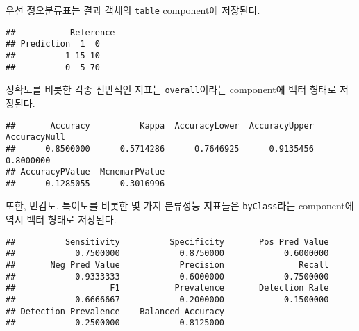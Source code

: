 \documentclass[
]{book}
\newenvironment{Shaded}{\begin{snugshade}}{\end{snugshade}}
\newcommand{\NormalTok}[1]{#1}
\newcommand{\SpecialCharTok}[1]{\textcolor[rgb]{0.00,0.00,0.00}{#1}}
\begin{document}
우선 정오분류표는 결과 객체의 \texttt{table} component에 저장된다.

\begin{Shaded}
\end{Shaded}

\begin{verbatim}
##           Reference
## Prediction  1  0
##          1 15 10
##          0  5 70
\end{verbatim}

정확도를 비롯한 각종 전반적인 지표는 \texttt{overall}이라는 component에 벡터 형태로 저장된다.

\begin{Shaded}
\end{Shaded}

\begin{verbatim}
##       Accuracy          Kappa  AccuracyLower  AccuracyUpper   AccuracyNull 
##      0.8500000      0.5714286      0.7646925      0.9135456      0.8000000 
## AccuracyPValue  McnemarPValue 
##      0.1285055      0.3016996
\end{verbatim}

또한, 민감도, 특이도를 비롯한 몇 가지 분류성능 지표들은 \texttt{byClass}라는 component에 역시 벡터 형태로 저장된다.

\begin{Shaded}
\end{Shaded}

\begin{verbatim}
##          Sensitivity          Specificity       Pos Pred Value 
##            0.7500000            0.8750000            0.6000000 
##       Neg Pred Value            Precision               Recall 
##            0.9333333            0.6000000            0.7500000 
##                   F1           Prevalence       Detection Rate 
##            0.6666667            0.2000000            0.1500000 
## Detection Prevalence    Balanced Accuracy 
##            0.2500000            0.8125000
\end{verbatim}
\end{document}
